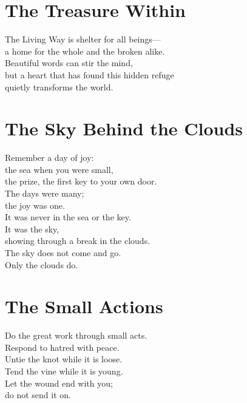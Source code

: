 \documentclass[10pt, openright]{book}
\newcommand{\sectionbreak}{\filbreak}
\newcommand{\sayingsource}[1]{\par\nopagebreak\vspace{0.3\baselineskip}{\raggedleft\footnotesize\itshape #1\par}}
\begin{document}
\sayingsource{Samyutta Nikaya 36.6 · Matthew 5:45 · Tao Te Ching 16}

\sectionbreak

\section{The Treasure Within}\label{the-treasure-within}

The Living Way is shelter for all beings---\\
a home for the whole and the broken alike.\\
Beautiful words can stir the mind,\\
but a heart that has found this hidden refuge\\
quietly transforms the world.

\sayingsource{Tao Te Ching 62}

\sectionbreak

\section{The Sky Behind the Clouds}\label{the-sky-behind-the-clouds}

Remember a day of joy:\\
the sea when you were small,\\
the prize, the first key to your own door.\\
The days were many;\\
the joy was one.\\
It was never in the sea or the key.\\
It was the sky,\\
showing through a break in the clouds.\\
The sky does not come and go.\\
Only the clouds do.

\sayingsource{Luke 17:21 · Taittiriya Upanishad 3.6}

\sectionbreak

\section{The Small Actions}\label{the-small-actions}

Do the great work through small acts.\\
Respond to hatred with peace.\\
Untie the knot while it is loose.\\
Tend the vine while it is young.\\
Let the wound end with you;\\
do not send it on.
\end{document}
